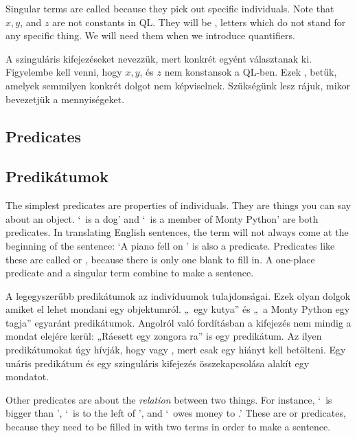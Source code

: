 Singular terms are called  because they pick out specific individuals. Note that $x, y$, and $z$ are not constants in QL. They will be , letters which do not stand for any specific thing. We will need them when we introduce quantifiers.

A szinguláris kifejezéseket  nevezzük, mert konkrét egyént választanak ki. Figyelembe kell venni, hogy $x, y$, és $z$ nem konstansok a QL-ben. Ezek , betűk, amelyek semmilyen konkrét dolgot nem képviselnek. Szükségünk lesz rájuk, mikor bevezetjük a mennyiségeket.



\subsection*{Predicates}
\subsection{Predikátumok}

The simplest predicates are properties of individuals. They are things you can say about an object. `\blank\ is a dog' and `\blank\ is a member of Monty Python' are both predicates. In translating English sentences, the term will not always come at the beginning of the sentence: `A piano fell on \blank' is also a predicate. Predicates like these are called  or , because there is only one blank to fill in. A one-place predicate and a singular term combine to make a sentence.

A legegyszerűbb predikátumok az indivíduumok tulajdonságai. Ezek olyan dolgok amiket el lehet mondani egy objektumról. „\blank\ egy kutya” és „\blank\ a Monty Python egy tagja” egyaránt predikátumok. Angolról való fordításban a kifejezés nem mindig a mondat elejére kerül: „Ráesett egy zongora \blank\-ra” is egy predikátum. Az ilyen predikátumokat úgy hívják, hogy  vagy , mert csak egy hiányt kell betölteni. Egy unáris predikátum és egy szinguláris kifejezés összekapcsolása alakít egy mondatot.

Other predicates are about the \emph{relation} between two things. For instance, `\blank\ is bigger than \blank', `\blank\ is to the left of \blank', and `\blank\ owes money to \blank.' These are  or  predicates, because they need to be filled in with two terms in order to make a sentence.


